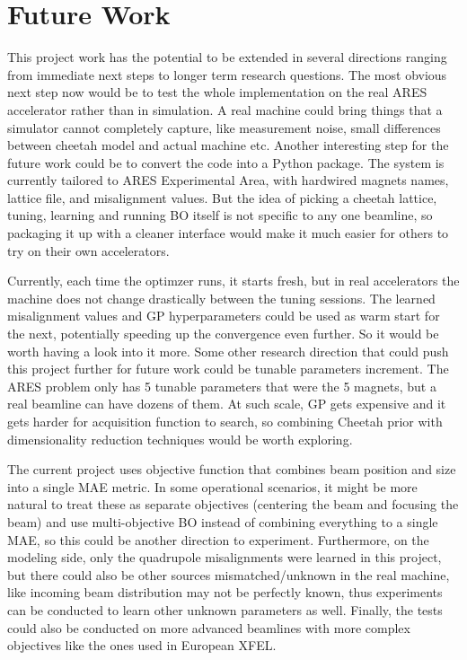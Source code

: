 \section{Future Work}

This project work has the potential to be extended in several directions ranging from
immediate next steps to longer term research questions. The most obvious next step now would be 
to test the whole implementation on the real ARES accelerator rather than in simulation.  
A real machine could bring things that a simulator cannot completely capture, 
like measurement noise, small differences between cheetah model and actual machine etc. 
 Another interesting step 
for the future work could be to convert the code into a Python package. 
The system is currently tailored to ARES Experimental Area, with hardwired magnets names, lattice file, 
and misalignment values. But the idea of picking a cheetah lattice, tuning, learning and running BO 
itself is not specific to any one beamline, so packaging it up with a cleaner interface would 
make it much easier for others to try on their own accelerators.  \

Currently, each time the optimzer runs, it starts fresh, but in real accelerators the machine does not change drastically between the tuning
sessions. The learned misalignment values and GP hyperparameters could be used as warm start for the next,
potentially speeding up the convergence even further. So it would be worth having a look into it more. 
Some other research direction that could push this project further for future work could be 
tunable parameters increment. The ARES problem only has 5 tunable parameters that were the 5 magnets, 
but a real beamline can have dozens of them. At such scale, GP gets expensive and it gets 
harder for acquisition function to search, so combining Cheetah prior with dimensionality 
reduction techniques would be worth exploring. 


The current project uses objective function that combines beam position and size into a single MAE metric.
In some operational scenarios, it might be more natural to treat these as separate objectives 
(centering the beam and focusing the beam) and use multi-objective BO instead of combining everything to a single MAE,
so this could be another direction to experiment. Furthermore, on the modeling side, only the quadrupole misalignments were learned in this project, 
but there could also be other sources mismatched/unknown in the real machine, like incoming 
beam distribution may not be perfectly known, thus experiments can be conducted 
to learn other unknown parameters as well. Finally, the tests could also be conducted on more advanced beamlines with more 
complex objectives like the ones used in European XFEL. 

